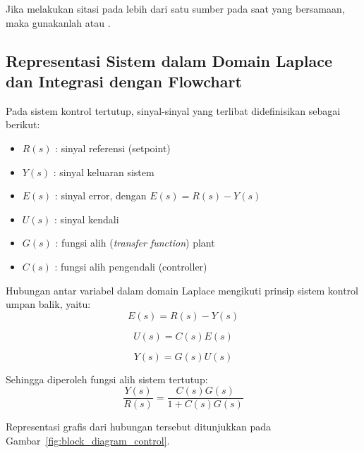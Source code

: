         Jika melakukan sitasi pada lebih dari satu sumber pada saat yang bersamaan, maka gunakanlah \cite{edwards_sliding_1998, b1} atau \cite{edwards_sliding_1998, b1, b2, b3}.
    

    \subsection{Representasi Sistem dalam Domain Laplace dan Integrasi dengan Flowchart}
    \label{subsec:laplace_block_diagram}
    
    Pada sistem kontrol tertutup, sinyal-sinyal yang terlibat didefinisikan sebagai berikut:
    \begin{itemize}
        \item $R(s)$ : sinyal referensi (setpoint)
        \item $Y(s)$ : sinyal keluaran sistem
        \item $E(s)$ : sinyal error, dengan $E(s) = R(s) - Y(s)$
        \item $U(s)$ : sinyal kendali
        \item $G(s)$ : fungsi alih (\textit{transfer function}) plant
        \item $C(s)$ : fungsi alih pengendali (controller)
    \end{itemize}
    
    Hubungan antar variabel dalam domain Laplace mengikuti prinsip sistem kontrol umpan balik, yaitu:
    \begin{equation}
        E(s) = R(s) - Y(s)
    \end{equation}
    
    \begin{equation}
        U(s) = C(s)E(s)
    \end{equation}
    
    \begin{equation}
        Y(s) = G(s)U(s)
    \end{equation}
    
    Sehingga diperoleh fungsi alih sistem tertutup:
    \begin{equation}
        \frac{Y(s)}{R(s)} = \frac{C(s)G(s)}{1 + C(s)G(s)}
    \end{equation}
    
    \noindent Representasi grafis dari hubungan tersebut ditunjukkan pada Gambar~\ref{fig:block_diagram_control}.
    
